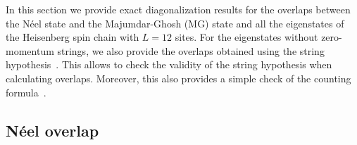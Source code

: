 \documentclass[11pt]{iopart}
\begin{document}
In this section we provide exact diagonalization results for the overlaps between the 
N\'eel state and the Majumdar-Ghosh (MG) state and all the eigenstates of the Heisenberg 
spin chain with $L=12$ sites. For the eigenstates without zero-momentum strings, we 
also provide the overlaps obtained using the string hypothesis~. 
This allows to check the validity of the string hypothesis when calculating overlaps. 
Moreover, this also provides a simple check of the counting formula~. 

\subsection{N\'eel overlap}
\label{app-Neel}
\end{document}
